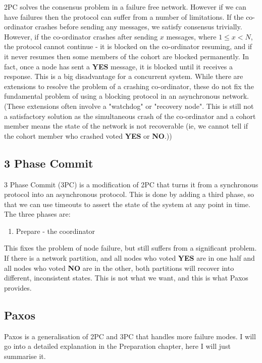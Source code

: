 \documentclass[12pt,twoside,notitlepage]{report}
\begin{document}
2PC solves the consensus problem in a failure free network. However if we can have failures then
the protocol can suffer from a number of limitations. If the co-ordinator crashes before sending
any messages, we satisfy consensus trivially. However, if the co-ordinator crashes after sending
$x$ messages, where $1 \le x < N$, the protocol cannot continue - it is blocked on the
co-ordinator resuming, and if it never resumes then some members of the cohort are blocked
permanently. In fact, once a node has sent a {\bf YES} message, it is blocked until it receives a
response. This is a big disadvantage for a concurrent system. While there are extensions to
resolve the problem of a crashing co-ordinator, these do not fix the fundamental problem of using
a blocking protocol in an asynchronous network. (These extensions often involve a "watchdog" or
"recovery node". This is still not a satisfactory solution as the simultaneous crash of the
co-ordinator and a cohort member means the state of the network is not recoverable (ie, we cannot
tell if the cohort member who crashed voted {\bf YES} or {\bf NO}.))

\subsection*{3 Phase Commit}

3 Phase Commit (3PC) is a modification of 2PC that turns it from a synchronous protocol into an
asynchronous protocol. This is done by adding a third phase, so that we can use timeouts to assert
the state of the system at any point in time. The three phases are:

\begin{enumerate}
\item Prepare - the coordinator
\end{enumerate}

This fixes the problem of node failure, but still suffers from a significant problem. If there is
a network partition, and all nodes who voted {\bf YES} are in one half and all nodes who voted
{\bf NO} are in the other, both partitions will recover into different, inconsistent states. This
is not what we want, and this is what Paxos provides.

\subsection*{Paxos}

Paxos is a generalisation of 2PC and 3PC that handles more failure modes. I will go into a
detailed explanation in the Preparation chapter, here I will just summarise it. 
\end{document}
